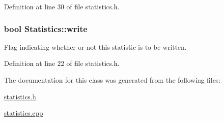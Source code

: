 \-Definition at line 30 of file statistics.\-h.

\hypertarget{classStatistics_a0d4a9d7982000ebb46ed99e8976758e4}{
\subsubsection[{write}]{\setlength{\rightskip}{0pt plus 5cm}bool {\bf \-Statistics\-::write}}}\label{d9/d41/classStatistics_a0d4a9d7982000ebb46ed99e8976758e4}


\-Flag indicating whether or not this statistic is to be written. 



\-Definition at line 22 of file statistics.\-h.



\-The documentation for this class was generated from the following files\-:\begin{DoxyCompactItemize}
\item 
\hyperlink{statistics_8h}{statistics.\-h}\item 
\hyperlink{statistics_8cpp}{statistics.\-cpp}\end{DoxyCompactItemize}
